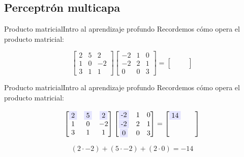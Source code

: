 \documentclass[10pt,border=3pt,tikz]{beamer}
\begin{document}
    \subsection{Perceptrón multicapa}
    \begin{frame}{Producto matricial}{Intro al aprendizaje profundo}
        Recordemos cómo opera el producto matricial:
        
        $$\begin{bmatrix}
            2 & 5 & 2\\
            1 & 0 & -2\\
            3 & 1 & 1
        \end{bmatrix}
        \begin{bmatrix}
        -2 & 1 & 0\\
        -2 & 2 & 1\\
        0 & 0 & 3
        \end{bmatrix} = 
        \begin{bmatrix}
         &  & \\
         &  & \\
         &  & 
        \end{bmatrix}$$
    \end{frame}
    
    \begin{frame}{Producto matricial}{Intro al aprendizaje profundo}
        Recordemos cómo opera el producto matricial:
        
        $$\begin{bmatrix}
            \colorbox{blue!10}{2} & \colorbox{blue!10}{5} & \colorbox{blue!10}{2}\\
            1 & 0 & -2\\
            3 & 1 & 1
        \end{bmatrix}
        \begin{bmatrix}
            \colorbox{blue!10}{-2} & 1 & 0\\
            \colorbox{blue!10}{-2} & 2 & 1\\
            \colorbox{blue!10}{0} & 0 & 3
        \end{bmatrix} = 
        \begin{bmatrix}
           \colorbox{blue!10}{14} &  & \\
            &  & \\
            &  & 
        \end{bmatrix}$$
        
        $$(2 \cdot -2) + (5 \cdot -2) + (2 \cdot 0) = -14$$
    \end{frame}
    
\end{document}
